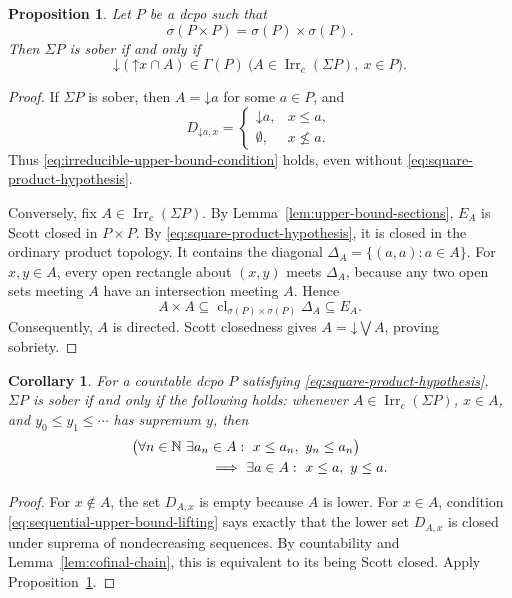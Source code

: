 \documentclass[11pt,reqno]{amsart}
\newtheorem{proposition}[theorem]{Proposition}
\newtheorem{corollary}[theorem]{Corollary}
\theoremstyle{definition}
\theoremstyle{remark}
\numberwithin{equation}{section}
\newcommand{\N}{\mathbb N}
\newcommand{\down}[1]{\mathord{\downarrow}#1}
\newcommand{\up}[1]{\mathord{\uparrow}#1}
\newcommand{\Sc}{\sigma}
\newcommand{\Sig}{\Sigma}
\newcommand{\cl}{\operatorname{cl}}
\begin{document}
\begin{proposition}\label{prop:irreducible-upper-bound-sober}
Let $P$ be a dcpo such that
\begin{equation}\label{eq:square-product-hypothesis}
 \Sc(P\times P)=\Sc(P)\times\Sc(P).
\end{equation}
Then $\Sig P$ is sober if and only if
\begin{equation}\label{eq:irreducible-upper-bound-condition}
 \down(\up x\cap A)\in\Gamma(P)
 ~\bigl(A\in\operatorname{Irr}_c(\Sig P),\ x\in P\bigr).
\end{equation}
\end{proposition}
\begin{proof}
If $\Sig P$ is sober, then $A=\down a$ for some $a\in P$, and
\[
 D_{\down a,x}=
 \begin{cases}
  \down a,&x\le a,\\
  \emptyset,&x\nleq a.
 \end{cases}
\]
Thus \eqref{eq:irreducible-upper-bound-condition} holds, even without \eqref{eq:square-product-hypothesis}.

Conversely, fix $A\in\operatorname{Irr}_c(\Sig P)$. By Lemma~\ref{lem:upper-bound-sections}, $E_A$ is Scott closed in $P\times P$. By \eqref{eq:square-product-hypothesis}, it is closed in the ordinary product topology. It contains the diagonal $\Delta_A=\{(a,a):a\in A\}$. For $x,y\in A$, every open rectangle about $(x,y)$ meets $\Delta_A$, because any two open sets meeting $A$ have an intersection meeting $A$. Hence
\[
 A\times A\subseteq\cl_{\sigma(P)\times\sigma(P)}\Delta_A\subseteq E_A.
\]
Consequently, $A$ is directed. Scott closedness gives $A=\down\bigvee A$, proving sobriety.
\end{proof}

\begin{corollary}\label{cor:sequential-upper-bound}
For a countable dcpo $P$ satisfying \eqref{eq:square-product-hypothesis}, $\Sig P$ is sober if and only if the following holds: whenever $A\in\operatorname{Irr}_c(\Sig P)$, $x\in A$, and $y_0\le y_1\le\cdots$ has supremum $y$, then
\begin{equation}\label{eq:sequential-upper-bound-lifting}
 \begin{aligned}
 &\bigl(\forall n\in\N\ \exists a_n\in A:\ x\le a_n,
                  \ y_n\le a_n\bigr)\\
 &\hspace{20mm}\Longrightarrow~
 \exists a\in A:\ x\le a,\ y\le a.
 \end{aligned}
\end{equation}
\end{corollary}
\begin{proof}
For $x\notin A$, the set $D_{A,x}$ is empty because $A$ is lower. For $x\in A$, condition \eqref{eq:sequential-upper-bound-lifting} says exactly that the lower set $D_{A,x}$ is closed under suprema of nondecreasing sequences. By countability and Lemma~\ref{lem:cofinal-chain}, this is equivalent to its being Scott closed. Apply Proposition~\ref{prop:irreducible-upper-bound-sober}.
\end{proof}
\end{document}
